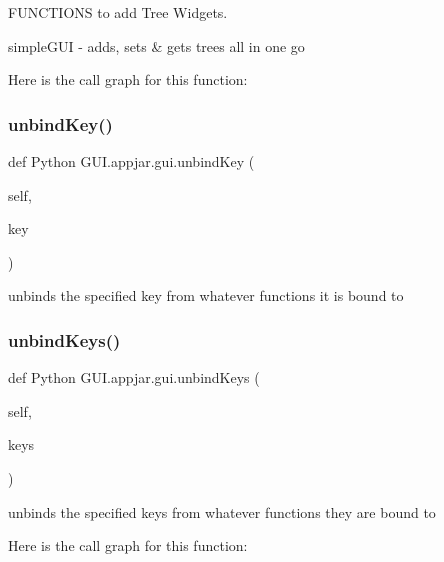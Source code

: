 \begin{DoxyVerb}
F\+U\+N\+C\+T\+I\+O\+NS to add Tree Widgets. 

\begin{DoxyVerb}simpleGUI - adds, sets & gets trees all in one go \end{DoxyVerb}
 Here is the call graph for this function\+:
\mbox{\label{class_python_01_g_u_i_1_1appjar_1_1gui_a273f8c50017293348c2a46d997adbccc}} 
\subsubsection{\texorpdfstring{unbind\+Key()}{unbindKey()}}
{\footnotesize\ttfamily def Python G\+U\+I.\+appjar.\+gui.\+unbind\+Key (\begin{DoxyParamCaption}\item[{}]{self,  }\item[{}]{key }\end{DoxyParamCaption})}

\begin{DoxyVerb}unbinds the specified key from whatever functions it is bound to \end{DoxyVerb}
 \mbox{\label{class_python_01_g_u_i_1_1appjar_1_1gui_a7f94d2239400dadb0d8933064f78dbdd}} 
\subsubsection{\texorpdfstring{unbind\+Keys()}{unbindKeys()}}
{\footnotesize\ttfamily def Python G\+U\+I.\+appjar.\+gui.\+unbind\+Keys (\begin{DoxyParamCaption}\item[{}]{self,  }\item[{}]{keys }\end{DoxyParamCaption})}

\begin{DoxyVerb}unbinds the specified keys from whatever functions they are bound to \end{DoxyVerb}
 Here is the call graph for this function\+:
\mbox{\label{class_python_01_g_u_i_1_1appjar_1_1gui_aa0a271b0b17a802e6d7b598c12bcd930}} 

\end{DoxyVerb}
